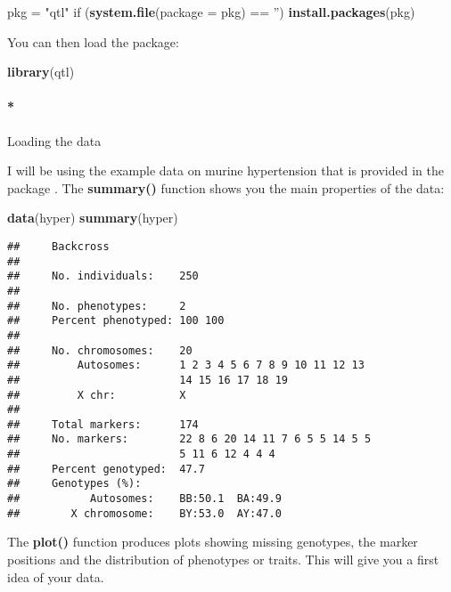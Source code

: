 \documentclass[12pt,]{krantz}
\makeatletter
\newenvironment{Shaded}{\begin{snugshade}}{\end{snugshade}}
\newcommand{\KeywordTok}[1]{\textcolor[rgb]{0.27,0.27,0.27}{\textbf{{#1}}}}
\newcommand{\DataTypeTok}[1]{\textcolor[rgb]{0.27,0.27,0.27}{{#1}}}
\newcommand{\StringTok}[1]{\textcolor[rgb]{0.5,0.5,0.5}{{#1}}}
\newcommand{\NormalTok}[1]{{#1}}
\let\oldparagraph\paragraph
\renewcommand{\paragraph}[1]{\oldparagraph{#1}\mbox{}}
\newenvironment{kframe}{%
\medskip{}
\setlength{\fboxsep}{.8em}
 \def\at@end@of@kframe{}%
 \ifinner\ifhmode%
  \def\at@end@of@kframe{\end{minipage}}%
  \begin{minipage}{\columnwidth}%
 \fi\fi%
 \def\FrameCommand##1{\hskip\@totalleftmargin \hskip-\fboxsep
 \colorbox{shadecolor}{##1}\hskip-\fboxsep
     \hskip-\linewidth \hskip-\@totalleftmargin \hskip\columnwidth}%
 \MakeFramed {\advance\hsize-\width
   \@totalleftmargin\z@ \linewidth\hsize
   \@setminipage}}%
 {\par\unskip\endMakeFramed%
 \at@end@of@kframe}
\renewenvironment{Shaded}{\begin{kframe}}{\end{kframe}}
\makeatother
\begin{document}
\begin{Shaded}
\begin{Highlighting}[]
\NormalTok{pkg =}\StringTok{ "qtl"}
\NormalTok{if (}\KeywordTok{system.file}\NormalTok{(}\DataTypeTok{package =} \NormalTok{pkg) ==}\StringTok{ ''}\NormalTok{) }\KeywordTok{install.packages}\NormalTok{(pkg)}
\end{Highlighting}
\end{Shaded}

You can then load the package:

\begin{Shaded}
\begin{Highlighting}[]
\KeywordTok{library}\NormalTok{(qtl)}
\end{Highlighting}
\end{Shaded}

\paragraph*{Loading the data}\label{loading-the-data}

I will be using the example data on murine hypertension that is provided
in the package \citep{Sugiyama200170}. The \textbf{summary()} function
shows you the main properties of the data:

\begin{Shaded}
\begin{Highlighting}[]
\KeywordTok{data}\NormalTok{(hyper)}
\KeywordTok{summary}\NormalTok{(hyper)}
\end{Highlighting}
\end{Shaded}

\begin{verbatim}
##     Backcross
## 
##     No. individuals:    250 
## 
##     No. phenotypes:     2 
##     Percent phenotyped: 100 100 
## 
##     No. chromosomes:    20 
##         Autosomes:      1 2 3 4 5 6 7 8 9 10 11 12 13 
##                         14 15 16 17 18 19 
##         X chr:          X 
## 
##     Total markers:      174 
##     No. markers:        22 8 6 20 14 11 7 6 5 5 14 5 5 
##                         5 11 6 12 4 4 4 
##     Percent genotyped:  47.7 
##     Genotypes (%):    
##           Autosomes:    BB:50.1  BA:49.9 
##        X chromosome:    BY:53.0  AY:47.0
\end{verbatim}

The \textbf{plot()} function produces plots showing missing genotypes,
the marker positions and the distribution of phenotypes or traits. This
will give you a first idea of your data.
\end{document}
